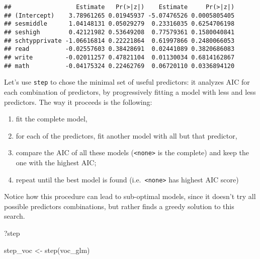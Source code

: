 \documentclass[
  oneside]{book}
\newenvironment{Shaded}{\begin{snugshade}}{\end{snugshade}}
\newcommand{\FunctionTok}[1]{\textcolor[rgb]{0.00,0.00,0.00}{#1}}
\newcommand{\NormalTok}[1]{#1}
\newcommand{\OtherTok}[1]{\textcolor[rgb]{0.56,0.35,0.01}{#1}}
\providecommand{\tightlist}{%
  \setlength{\itemsep}{0pt}\setlength{\parskip}{0pt}}
\begin{document}
\begin{verbatim}
##                  Estimate   Pr(>|z|)    Estimate     Pr(>|z|)
## (Intercept)    3.78961265 0.01945937 -5.07476526 0.0005805405
## sesmiddle      1.04148131 0.05029279  0.23316035 0.6254706198
## seshigh        0.42121982 0.53649208  0.77579361 0.1580040841
## schtypprivate -1.06616814 0.22221864  0.61997866 0.2480066053
## read          -0.02557603 0.38428691  0.02441089 0.3820686083
## write         -0.02011257 0.47821104  0.01130034 0.6814162867
## math          -0.04175324 0.22462769  0.06720110 0.0336894120
\end{verbatim}

Let's use \texttt{step} to chose the minimal set of useful predictors:
it analyzes AIC for each combination of predictors, by progressively
fitting a model with less and less predictors. The way it proceeds is the
following:

\begin{enumerate}
\def\labelenumi{\arabic{enumi}.}
\tightlist
\item
  fit the complete model,
\item
  for each of the predictors, fit another model with all but that predictor,
\item
  compare the AIC of all these models (\texttt{\textless{}none\textgreater{}} is the complete) and keep the
  one with the highest AIC;
\item
  repeat until the best model is found (i.e.~\texttt{\textless{}none\textgreater{}} has highest AIC
  score)
\end{enumerate}

Notice how this procedure can lead to sub-optimal models, since it doesn't try
all possible predictors combinations, but rather finds a greedy solution to this
search.

\begin{Shaded}
\begin{Highlighting}[]
\NormalTok{?step}
\end{Highlighting}
\end{Shaded}

\begin{Shaded}
\begin{Highlighting}[]
\NormalTok{step\_voc }\OtherTok{\textless{}{-}} \FunctionTok{step}\NormalTok{(voc\_glm)}
\end{Highlighting}
\end{Shaded}
\end{document}
